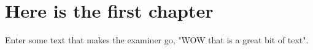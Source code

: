 \chapter{Here is the first chapter}

Enter some text that makes the examiner go, "WOW that is a great bit of text". 

